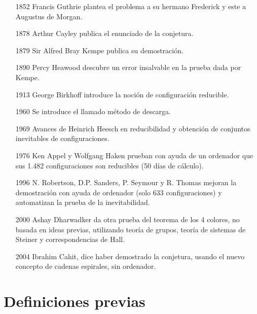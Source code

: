 \documentclass[3p,times,a4paper,twocolumn,authoryear]{elsarticle} %
\begin{document}
\begin{enumerate}
	
	\item[{\color{DarkBlue}1852}] Francis Guthrie plantea el problema a su hermano Frederick y este a Augustus de Morgan.
	
	\item[{\color{DarkBlue}1878}] Arthur Cayley publica el enunciado de la conjetura.
	
	\item[{\color{DarkBlue}1879}] Sir Alfred Bray Kempe publica su demostración.
	
	\item[{\color{DarkBlue}1890}] Percy Heawood descubre un error insalvable en la prueba dada por Kempe.
	
	\item[{\color{DarkBlue}1913}] George Birkhoff introduce la noción de configuración reducible.
	
	\item[{\color{DarkBlue}1960}] Se introduce el llamado método de descarga.
	
	\item[{\color{DarkBlue}1969}] Avances de Heinrich Heesch en reducibilidad y obtención de conjuntos inevitables de configuraciones.
	
	\item[{\color{DarkBlue}1976}] Ken Appel y Wolfgang Haken prueban con ayuda de un ordenador que sus 1.482 configuraciones son reducibles (50 días de cálculo).
	
	\item[{\color{DarkBlue}1996}] N. Robertson, D.P. Sanders, P. Seymour y R. Thomas mejoran la demostración con ayuda de ordenador (solo 633 configuraciones) y automatizan la prueba de la inevitabilidad.
	
	\item[{\color{DarkBlue}2000}] Ashay Dharwadker da otra prueba del teorema de los 4 colores, no basada en ideas previas, utilizando teoría de grupos, teoría de sistemas de Steiner y correspondencias de Hall.
	
	\item[{\color{DarkBlue}2004}] Ibrahim Cahit, dice haber demostrado la conjetura, usando el nuevo concepto de cadenas espirales, sin ordenador.

\end{enumerate}

\section{Definiciones previas}
\end{document}
